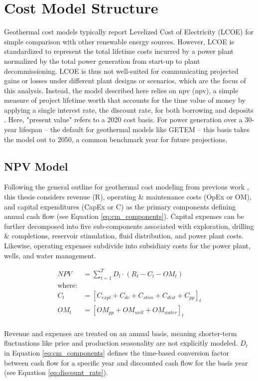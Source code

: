 \section{Cost Model Structure}
\label{ch4:cm_structure}

Geothermal cost models typically report Levelized Cost of Electricity (LCOE) for simple comparison with other renewable energy sources. However, LCOE is standardized to represent the total lifetime costs incurred by a power plant normalized by the total power generation from start-up to plant decommissioning. LCOE is thus not well-suited for communicating projected gains or losses under different plant designs or scenarios, which are the focus of this analysis. Instead, the model described here relies on \acrlong{npv} (\acrshort{npv}), a simple measure of project lifetime worth that accounts for the time value of money by applying a single interest rate, the discount rate, for both borrowing and deposits \citep[p.\ 195-215]{de_neufville_flexibility_2011}. Here, "present value" refers to a 2020 cost basis. For power generation over a 30-year lifespan -- the default for geothermal models like GETEM \citep{entingh_volume_2006} -- this basis takes the model out to 2050, a common benchmark year for future projections. 

\subsection{NPV Model}
\label{ch4:cm_npv}
Following the general outline for geothermal cost modeling from previous work \citep[e.g.,][]{augustine_hydrothermal_2009, beckers_introducing_2013,tester_future_2006}, this thesis considers revenue (R), operating \& maintenance costs (OpEx or OM), and capital expenditures (CapEx or C) as the primary components defining annual cash flow (see Equation \ref{eq:cm_components}). Capital expenses can be further decomposed into five  sub-components associated with exploration, drilling \& completions, reservoir stimulation, fluid distribution, and power plant costs. Likewise, operating expenses subdivide into subsidiary costs for the power plant, wells, and water management.

\begin{equation}
    \label{eq:cm_components}
    \begin{aligned}
    NPV &= \sum_{t=1}^{T}D_t \cdot \left( R_t - C_t - OM_t \right)\\
    \text{where:}\\
    C_t &= \left[C_{expl} + C_{dc} + C_{stim} + C_{dist} + C_{pp}\right]_t\\
    OM_t &= \left[OM_{pp} + OM_{well} + OM_{water}\right]_t
    \end{aligned}
\end{equation}
\\
Revenue and expenses are treated on an annual basis, meaning shorter-term fluctuations like price and production seasonality are not explicitly modeled. $D_t$ in Equation \ref{eq:cm_components} defines the time-based conversion factor between cash flow for a specific year and discounted cash flow for the basis year (see Equation \ref{eq:discount_rate}).

